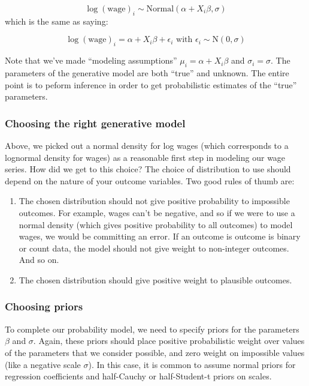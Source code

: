\documentclass[]{book}
\providecommand{\tightlist}{%
  \setlength{\itemsep}{0pt}\setlength{\parskip}{0pt}}
\begin{document}
\[
\log(\mbox{wage})_{i} \sim \mbox{Normal}(\alpha + X_{i}\beta, \sigma)
\] which is the same as saying:

\[
\log(\mbox{wage})_{i} = \alpha + X_{i}\beta + \epsilon_{i} \mbox{ with } \epsilon_{i} \sim \mbox{N}(0, \sigma)
\]

Note that we've made ``modeling assumptions''
\(\mu_{i} = \alpha + X_{i}\beta\) and \(\sigma_{i} = \sigma\). The
parameters of the generative model are both ``true'' and unknown. The
entire point is to peform inference in order to get probabilistic
estimates of the ``true'' parameters.

\subsubsection{Choosing the right generative
model}\label{choosing-the-right-generative-model}

Above, we picked out a normal density for log wages (which corresponds
to a lognormal density for wages) as a reasonable first step in modeling
our wage series. How did we get to this choice? The choice of
distribution to use should depend on the nature of your outcome
variables. Two good rules of thumb are:

\begin{enumerate}
\def\labelenumi{\arabic{enumi}.}
\tightlist
\item
  The chosen distribution should not give positive probability to
  impossible outcomes. For example, wages can't be negative, and so if
  we were to use a normal density (which gives positive probability to
  all outcomes) to model wages, we would be committing an error. If an
  outcome is outcome is binary or count data, the model should not give
  weight to non-integer outcomes. And so on.
\item
  The chosen distribution should give positive weight to plausible
  outcomes.
\end{enumerate}

\subsubsection{Choosing priors}\label{choosing-priors}

To complete our probability model, we need to specify priors for the
parameters \(\beta\) and \(\sigma\). Again, these priors should place
positive probabilistic weight over values of the parameters that we
consider possible, and zero weight on impossible values (like a negative
scale \(\sigma\)). In this case, it is common to assume normal priors
for regression coefficients and half-Cauchy or half-Student-t priors on
scales.
\end{document}
